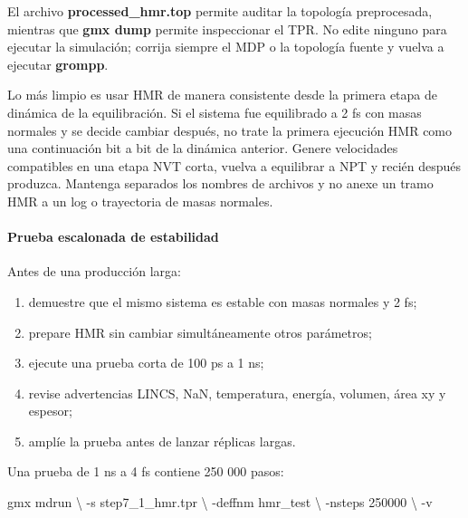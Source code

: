 \documentclass[
  spanish,
  11pt,
  a4paper]{article}
\newenvironment{Shaded}{\begin{snugshade}}{\end{snugshade}}
\newcommand{\AttributeTok}[1]{\textcolor[rgb]{0.13,0.29,0.53}{#1}}
\newcommand{\DataTypeTok}[1]{\textcolor[rgb]{0.13,0.29,0.53}{#1}}
\newcommand{\ExtensionTok}[1]{#1}
\newcommand{\NormalTok}[1]{#1}
\providecommand{\tightlist}{%
  \setlength{\itemsep}{0pt}\setlength{\parskip}{0pt}}
\begin{document}
El archivo \textbf{processed\_hmr.top} permite auditar la topología
preprocesada, mientras que \textbf{gmx dump} permite inspeccionar el
TPR. No edite ninguno para ejecutar la simulación; corrija siempre el
MDP o la topología fuente y vuelva a ejecutar \textbf{grompp}.

Lo más limpio es usar HMR de manera consistente desde la primera etapa
de dinámica de la equilibración. Si el sistema fue equilibrado a 2 fs
con masas normales y se decide cambiar después, no trate la primera
ejecución HMR como una continuación bit a bit de la dinámica anterior.
Genere velocidades compatibles en una etapa NVT corta, vuelva a
equilibrar a NPT y recién después produzca. Mantenga separados los
nombres de archivos y no anexe un tramo HMR a un log o trayectoria de
masas normales.

\paragraph{Prueba escalonada de
estabilidad}\label{prueba-escalonada-de-estabilidad}

Antes de una producción larga:

\begin{enumerate}
\def\labelenumi{\arabic{enumi}.}
\tightlist
\item
  demuestre que el mismo sistema es estable con masas normales y 2 fs;
\item
  prepare HMR sin cambiar simultáneamente otros parámetros;
\item
  ejecute una prueba corta de 100 ps a 1 ns;
\item
  revise advertencias LINCS, NaN, temperatura, energía, volumen, área xy
  y espesor;
\item
  amplíe la prueba antes de lanzar réplicas largas.
\end{enumerate}

Una prueba de 1 ns a 4 fs contiene 250 000 pasos:

\begin{Shaded}
\begin{Highlighting}[]
\ExtensionTok{gmx}\NormalTok{ mdrun }\DataTypeTok{\textbackslash{}}
    \AttributeTok{{-}s}\NormalTok{ step7\_1\_hmr.tpr }\DataTypeTok{\textbackslash{}}
    \AttributeTok{{-}deffnm}\NormalTok{ hmr\_test }\DataTypeTok{\textbackslash{}}
    \AttributeTok{{-}nsteps}\NormalTok{ 250000 }\DataTypeTok{\textbackslash{}}
    \AttributeTok{{-}v}
\end{Highlighting}
\end{Shaded}
\end{document}
